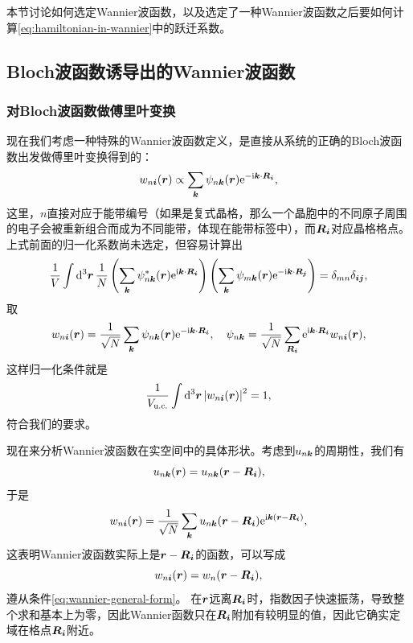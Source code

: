 本节讨论如何选定Wannier波函数，以及选定了一种Wannier波函数之后要如何计算\eqref{eq:hamiltonian-in-wannier}中的跃迁系数。

\subsection{Bloch波函数诱导出的Wannier波函数}

\subsubsection{对Bloch波函数做傅里叶变换}

现在我们考虑一种特殊的Wannier波函数定义，是直接从系统的正确的Bloch波函数出发做傅里叶变换得到的：
\[
    w_{n\vb*{i}}(\vb*{r}) \propto \sum_{\vb*{k}} \psi_{n\vb*{k}}(\vb*{r}) \mathrm{e}^{- \mathrm{i} \vb*{k} \cdot \vb*{R}_{\vb*{i}}},
\]
这里，$n$直接对应于能带编号（如果是复式晶格，那么一个晶胞中的不同原子周围的电子会被重新组合而成为不同能带，体现在能带标签中），而$\vb*{R}_{\vb*{i}}$对应晶格格点。
上式前面的归一化系数尚未选定，但容易计算出
\[
    \frac{1}{V} \int \dd[3]{\vb*{r}} \frac{1}{N} \left( \sum_{\vb*{k}} \psi^*_{n\vb*{k}}(\vb*{r}) \mathrm{e}^{\mathrm{i} \vb*{k} \cdot \vb*{R}_{\vb*{i}}} \right) \left( \sum_{\vb*{k}} \psi_{m\vb*{k}}(\vb*{r}) \mathrm{e}^{- \mathrm{i} \vb*{k} \cdot \vb*{R}_{\vb*{j}}} \right) = \delta_{mn} \delta_{\vb*{i} \vb*{j}},
\]
取
\begin{equation}
    w_{n\vb*{i}}(\vb*{r}) = \frac{1}{\sqrt{N}} \sum_{\vb*{k}} \psi_{n\vb*{k}}(\vb*{r}) \mathrm{e}^{-\mathrm{i} \vb*{k} \cdot \vb*{R}_{\vb*{i}}}, \quad \psi_{n\vb*{k}} = \frac{1}{\sqrt{N}} \sum_{\vb*{R}_{\vb*{i}}} \mathrm{e}^{\mathrm{i} \vb*{k} \cdot \vb*{R}_{\vb*{i}}} w_{n \vb*{i}}(\vb*{r}),
    \label{eq:wannier-from-bloch}
\end{equation}
这样归一化条件就是
\begin{equation}
    \frac{1}{V_\text{u.c.}} \int \dd[3]{\vb*{r}} \abs{w_{n \vb*{i}}(\vb*{r})}^2 = 1,
\end{equation}
符合我们的要求。

现在来分析Wannier波函数在实空间中的具体形状。考虑到$u_{n\vb*{k}}$的周期性，我们有
\[
    u_{n\vb*{k}} (\vb*{r}) = u_{n\vb*{k}} (\vb*{r} - \vb*{R}_{\vb*{i}}),
\]
于是
\begin{equation}
    w_{n \vb*{i}}(\vb*{r}) = \frac{1}{\sqrt{N}} \sum_{\vb*{k}} u_{n\vb*{k}} (\vb*{r} - \vb*{R}_{\vb*{i}}) \mathrm{e}^{\mathrm{i} \vb*{k} (\vb*{r} - \vb*{R}_{\vb*{i}})},
\end{equation}
这表明Wannier波函数实际上是$\vb*{r} - \vb*{R}_{\vb*{i}}$的函数，可以写成
\begin{equation}
    w_{n\vb*{i}}(\vb*{r}) = w_{n}(\vb*{r} - \vb*{R}_{\vb*{i}}),
\end{equation}
遵从条件\eqref{eq:wannier-general-form}。
在$\vb*{r}$远离$\vb*{R}_{\vb*{i}}$时，指数因子快速振荡，导致整个求和基本上为零，因此Wannier函数只在$\vb*{R}_{\vb*{i}}$附加有较明显的值，因此它确实定域在格点$\vb*{R}_{\vb*{i}}$附近。

